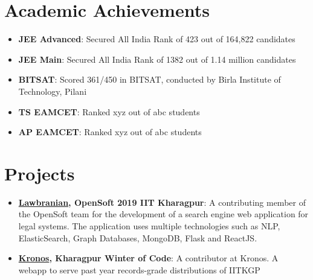 \documentclass[letterpaper,11pt]{article}
\makeatletter
\newcommand{\resumeItem}[2]{
  \item\small{
    \textbf{#1}{: #2 \vspace{-2pt}}
  }
}
\newcommand{\resumeSubheading}[4]{
  \vspace{-1pt}\item
    \begin{tabular*}{0.97\textwidth}{l@{\extracolsep{\fill}}r}
      \textbf{#1} & #2 \\
      \textit{\small#3} & \textit{\small #4} \\
    \end{tabular*}\vspace{-5pt}
}
\newcommand{\resumeSubItem}[2]{\resumeItem{#1}{#2}\vspace{-4pt}}
\newcommand{\resumeSubHeadingListStart}{\begin{itemize}[leftmargin=*]}
\newcommand{\resumeSubHeadingListEnd}{\end{itemize}}
\newcommand{\resumeItemListStart}{\begin{itemize}}
\newcommand{\resumeItemListEnd}{\end{itemize}\vspace{-5pt}}
\makeatother
\begin{document}


\section{Academic Achievements}
  \resumeSubHeadingListStart
    \resumeSubItem{JEE Advanced}
      {Secured All India Rank of 423 out of 164,822 candidates}
    \resumeSubItem{JEE Main}
      {Secured All India Rank of 1382 out of 1.14 million candidates}
    \resumeSubItem{BITSAT}
      {Scored 361/450 in BITSAT, conducted by Birla Institute of Technology, Pilani}
    \resumeSubItem{TS EAMCET}
      {Ranked xyz out of abc students}
    \resumeSubItem{AP EAMCET}
      {Ranked xyz out of abc students}
    
    \resumeSubHeadingListEnd
\section{Projects}
  \resumeSubHeadingListStart
    \resumeSubItem{\href{https://github.com/lbs-iitkgp/Opensoft-2019}{Lawbranian}, OpenSoft 2019 IIT Kharagpur}
      {A contributing member of the OpenSoft team for the development of a search engine web application for legal systems. The application uses multiple technologies such as NLP, ElasticSearch, Graph Databases, MongoDB, Flask and ReactJS.}
    \resumeSubItem{\href{https://github.com/metakgp/Kronos}{Kronos}, Kharagpur Winter of Code}
      {A contributor at Kronos. A webapp to serve past year records-grade distributions of IITKGP}
  \resumeSubHeadingListEnd
\end{document}
